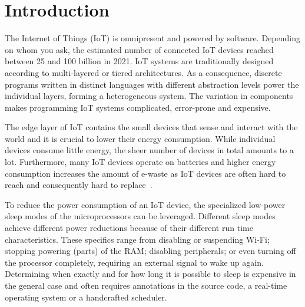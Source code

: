 \documentclass[runningheads]{llncs}
\begin{document}
\section{Introduction}
The Internet of Things (IoT) is omnipresent and powered by software.
Depending on whom you ask, the estimated number of connected IoT devices reached between 25 and 100 billion in 2021.
IoT systems are traditionally designed according to multi-layered or tiered architectures.
As a consequence, discrete programs written in distinct languages with different abstraction levels power the individual layers, forming a heterogeneous system.
The variation in components makes programming IoT systems complicated, error-prone and expensive.

The edge layer of IoT contains the small devices that sense and interact with the world and it is crucial to lower their energy consumption.
While individual devices consume little energy, the sheer number of devices in total amounts to a lot.
Furthermore, many IoT devices operate on batteries and higher energy consumption increases the amount of e-waste as IoT devices are often hard to reach and consequently hard to replace~\cite{NIZETIC2020122877}.

To reduce the power consumption of an IoT device, the specialized low-power sleep modes of the microprocessors can be leveraged.
Different sleep modes achieve different power reductions because of their different run time characteristics.
These specifics range from disabling or suspending Wi-Fi; stopping powering (parts) of the {RAM}; disabling peripherals; or even turning off the processor completely, requiring an external signal to wake up again.
Determining when exactly and for how long it is possible to sleep is expensive in the general case and often requires annotations in the source code, a real-time operating system or a handcrafted scheduler.
\end{document}

